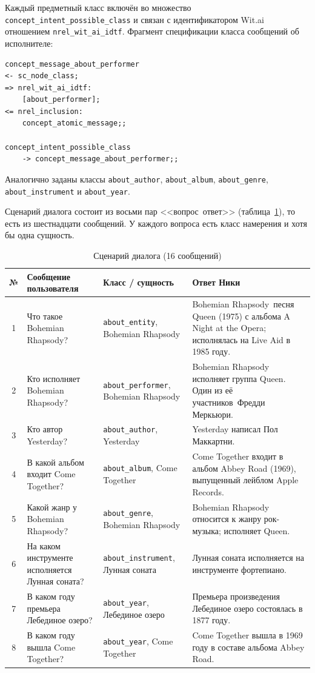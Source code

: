 Каждый предметный класс включён во множество \texttt{concept\_intent\_possible\_class} и связан с идентификатором Wit.ai отношением \texttt{nrel\_wit\_ai\_idtf}. Фрагмент спецификации класса сообщений об исполнителе:

\begin{lstlisting}[caption={Спецификация класса сообщений об исполнителе},label={lst:msg-performer},basicstyle=\footnotesize\ttfamily]
concept_message_about_performer
<- sc_node_class;
=> nrel_wit_ai_idtf:
	[about_performer];
<= nrel_inclusion:
	concept_atomic_message;;

concept_intent_possible_class
	-> concept_message_about_performer;;
\end{lstlisting}

Аналогично заданы классы \texttt{about\_author}, \texttt{about\_album}, \texttt{about\_genre}, \texttt{about\_instrument} и \texttt{about\_year}.

Сценарий диалога состоит из восьми пар <<вопрос~\mdash  ответ>> (таблица~\ref{tab:scenario}), то есть из шестнадцати сообщений. У каждого вопроса есть класс намерения и хотя бы одна сущность.

\begin{table}[H]
	\centering
	\scriptsize
	\begin{tabular}{|c|p{3.8cm}|p{2.6cm}|p{5.0cm}|}
		\hline
		№ & Сообщение пользователя & Класс / сущность & Ответ Ники \\
		\hline
		1 & Что такое Bohemian Rhapsody? & \texttt{about\_entity}, Bohemian Rhapsody & Bohemian Rhapsody~\mdash  песня Queen (1975) с альбома A Night at the Opera; исполнялась на Live Aid в 1985 году. \\
		\hline
		2 & Кто исполняет Bohemian Rhapsody? & \texttt{about\_performer}, Bohemian Rhapsody & Bohemian Rhapsody исполняет группа Queen. Один из её участников~\mdash  Фредди Меркьюри. \\
		\hline
		3 & Кто автор Yesterday? & \texttt{about\_author}, Yesterday & Yesterday написал Пол Маккартни. \\
		\hline
		4 & В какой альбом входит Come Together? & \texttt{about\_album}, Come Together & Come Together входит в альбом Abbey Road (1969), выпущенный лейблом Apple Records. \\
		\hline
		5 & Какой жанр у Bohemian Rhapsody? & \texttt{about\_genre}, Bohemian Rhapsody & Bohemian Rhapsody относится к жанру рок-музыка; исполняет Queen. \\
		\hline
		6 & На каком инструменте исполняется Лунная соната? & \texttt{about\_instrument}, Лунная соната & Лунная соната исполняется на инструменте фортепиано. \\
		\hline
		7 & В каком году премьера Лебединое озеро? & \texttt{about\_year}, Лебединое озеро & Премьера произведения Лебединое озеро состоялась в 1877 году. \\
		\hline
		8 & В каком году вышла Come Together? & \texttt{about\_year}, Come Together & Come Together вышла в 1969 году в составе альбома Abbey Road. \\
		\hline
	\end{tabular}
	\caption{Сценарий диалога (16 сообщений)}
	\label{tab:scenario}
\end{table}

